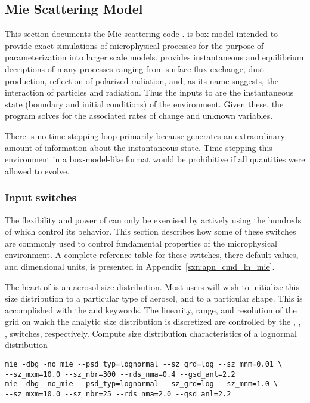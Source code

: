 \documentclass[12pt,twoside]{article}
\begin{document}
\clearpage
\subsection[Mie Scattering Model]{Mie Scattering Model}\label{sxn:mie}
This section documents the Mie scattering code . 
 is box model intended to provide exact simulations of
microphysical processes for the purpose of parameterization into
larger scale models.
 provides instantaneous and equilibrium decriptions of
many processes ranging from surface flux exchange, dust production,
reflection of polarized radiation, and, as its name suggests, the
interaction of particles and radiation.
Thus the inputs to  are the instantaneous state (boundary
and initial conditions) of the environment.
Given these, the program solves for the associated rates of change and
unknown variables.

There is no time-stepping loop primarily because 
generates an extraordinary amount of information about the
instantaneous state.
Time-stepping this environment in a box-model-like format would be
prohibitive if all quantities were allowed to evolve.

\subsubsection[Input switches]{Input switches}\label{sxn:cmd_ln_mie}
The flexibility and power of  can only be exercised by
actively using the hundreds of  which control
its behavior.
This section describes how some of these switches are commonly used
to control fundamental properties of the microphysical environment. 
A complete reference table for these switches, there default values,
and dimensional units, is presented in Appendix~\ref{sxn:apn_cmd_ln_mie}.  

The heart of  is an aerosol size distribution.
Most users will wish to initialize this size distribution to a
particular type of aerosol, and to a particular shape.
This is accomplished with the  and 
keywords. 
The linearity, range, and resolution of the grid on which the analytic
size distribution is discretized are controlled by the
, , , 
switches, respectively.
Compute size distribution characteristics of a lognormal distribution
\begin{verbatim}
mie -dbg -no_mie --psd_typ=lognormal --sz_grd=log --sz_mnm=0.01 \
--sz_mxm=10.0 --sz_nbr=300 --rds_nma=0.4 --gsd_anl=2.2
mie -dbg -no_mie --psd_typ=lognormal --sz_grd=log --sz_mnm=1.0 \
--sz_mxm=10.0 --sz_nbr=25 --rds_nma=2.0 --gsd_anl=2.2
\end{verbatim}
\end{document}
